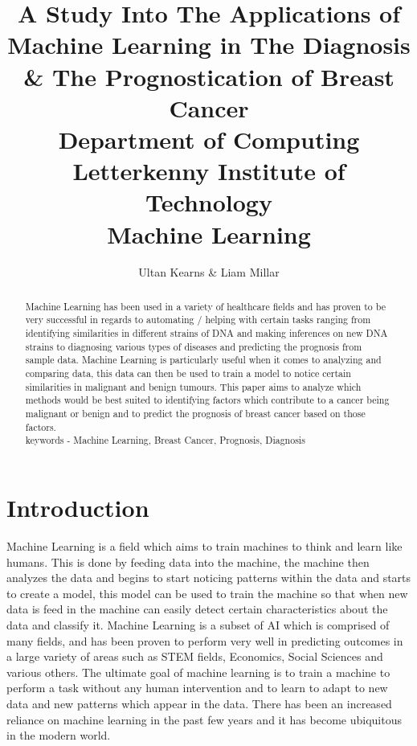\documentclass[conference]{IEEEtran}
\begin{document}
\title{
A Study Into The Applications of Machine Learning in The Diagnosis \& The Prognostication of Breast Cancer\\
\vspace{5mm}
\large Department of Computing \\
\vspace{3mm} 
\large Letterkenny Institute of Technology \\
\vspace{3mm} 
\large Machine Learning
}
\vspace{3mm}  
\author{Ultan Kearns \& Liam Millar}
\maketitle
\begin{abstract}
    Machine Learning has been used in a variety of healthcare fields and has proven to be very successful in regards to automating / helping with certain tasks ranging from identifying similarities in different strains of DNA and making inferences on new DNA strains to diagnosing various types of diseases and predicting the prognosis from sample data.  Machine Learning is particularly useful when it comes to analyzing and comparing data, this data can then be used to train a model to notice certain similarities in malignant and benign tumours.  This paper aims to analyze which methods would be best suited to identifying factors which contribute to a cancer being malignant or benign and to predict the prognosis of breast cancer based on those factors.\\
    keywords - Machine Learning, Breast Cancer, Prognosis, Diagnosis
\end{abstract}

\section{Introduction}
Machine Learning is a field which aims to train machines to think and learn like humans.  This is done by feeding data into the machine, the machine then analyzes the data and begins to start noticing patterns within the data and starts to create a model, this model can be used to train the machine so that when new data is feed in the machine can easily detect certain characteristics about the data and classify it.  Machine Learning is a subset of AI which is comprised of many fields, and has been proven to perform very well in predicting outcomes in a large variety of areas such as STEM fields, Economics, Social Sciences and various others.  The ultimate goal of machine learning is to train a machine to perform a task without any human intervention and to learn to adapt to new data and new patterns which appear in the data.  There has been an increased reliance on machine learning in the past few years and it has become ubiquitous in the modern world.\\
\end{document}
